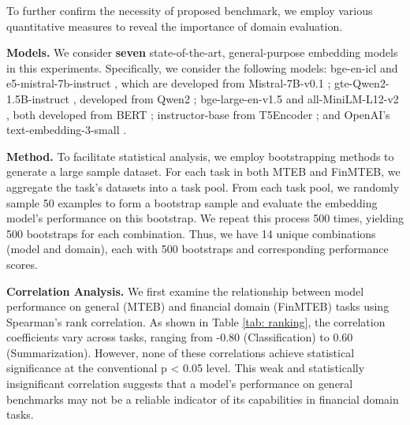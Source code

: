 

To further confirm the necessity of proposed benchmark, we employ various quantitative measures to reveal the importance of domain evaluation.

\textbf{Models.} We consider \textbf{seven} state-of-the-art, general-purpose embedding models in this experiments. Specifically, we consider the following models: bge-en-icl \citep{bge_embedding} and e5-mistral-7b-instruct \citep{e5}, which are developed from Mistral-7B-v0.1 \citep{mistral}; gte-Qwen2-1.5B-instruct \citep{gte}, developed from Qwen2 \citep{qwen2}; bge-large-en-v1.5 \citep{bge_embedding} and all-MiniLM-L12-v2 \citep{sentence-bert}, both developed from BERT \citep{Bert}; instructor-base \citep{instructor} from T5Encoder \citep{t5Encoder}; and OpenAI’s text-embedding-3-small \citep{openai_embedding}. 

\textbf{Method.} To facilitate statistical analysis, we employ bootstrapping methods to generate a large sample dataset. For each task in both MTEB and FinMTEB, we aggregate the task’s datasets into a task pool. From each task pool, we randomly sample 50 examples to form a bootstrap sample and evaluate the embedding model’s performance on this bootstrap. We repeat this process 500 times, yielding 500 bootstraps for each combination. Thus, we have 14 unique combinations (model and domain), each with 500 bootstraps and corresponding performance scores.

\textbf{Correlation Analysis.} We first examine the relationship between model performance on general (MTEB) and financial domain (FinMTEB) tasks using Spearman's rank correlation. As shown in Table \ref{tab: ranking}, the correlation coefficients vary across tasks, ranging from -0.80 (Classification) to 0.60 (Summarization). However, none of these correlations achieve statistical significance at the conventional p < 0.05 level. This weak and statistically insignificant correlation suggests that a model's performance on general benchmarks may not be a reliable indicator of its capabilities in financial domain tasks.



